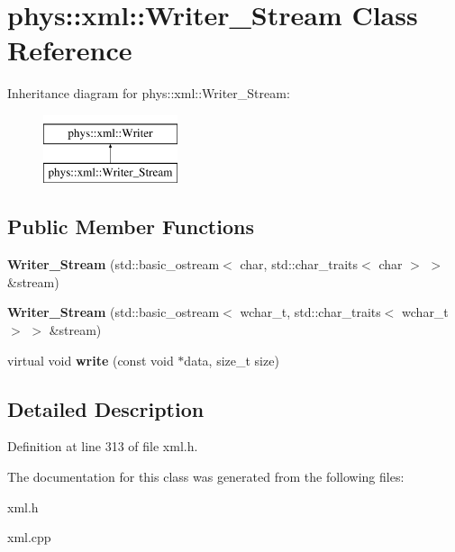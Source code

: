 \hypertarget{classphys_1_1xml_1_1Writer__Stream}{
\section{phys::xml::Writer\_\-Stream Class Reference}
\label{dc/d64/classphys_1_1xml_1_1Writer__Stream}
}
Inheritance diagram for phys::xml::Writer\_\-Stream:\begin{figure}[H]
\begin{center}
\leavevmode
\includegraphics[height=2.000000cm]{dc/d64/classphys_1_1xml_1_1Writer__Stream}
\end{center}
\end{figure}
\subsection*{Public Member Functions}
\begin{DoxyCompactItemize}
\item 
\hypertarget{classphys_1_1xml_1_1Writer__Stream_a4a770fabddf028fe207d50af81d6127d}{
{\bfseries Writer\_\-Stream} (std::basic\_\-ostream$<$ char, std::char\_\-traits$<$ char $>$ $>$ \&stream)}
\label{dc/d64/classphys_1_1xml_1_1Writer__Stream_a4a770fabddf028fe207d50af81d6127d}

\item 
\hypertarget{classphys_1_1xml_1_1Writer__Stream_adb18437fd8e3b203d3521120adb50d80}{
{\bfseries Writer\_\-Stream} (std::basic\_\-ostream$<$ wchar\_\-t, std::char\_\-traits$<$ wchar\_\-t $>$ $>$ \&stream)}
\label{dc/d64/classphys_1_1xml_1_1Writer__Stream_adb18437fd8e3b203d3521120adb50d80}

\item 
\hypertarget{classphys_1_1xml_1_1Writer__Stream_a96fed925ea63e09feee2e7f62f014538}{
virtual void {\bfseries write} (const void $\ast$data, size\_\-t size)}
\label{dc/d64/classphys_1_1xml_1_1Writer__Stream_a96fed925ea63e09feee2e7f62f014538}

\end{DoxyCompactItemize}


\subsection{Detailed Description}


Definition at line 313 of file xml.h.



The documentation for this class was generated from the following files:\begin{DoxyCompactItemize}
\item 
xml.h\item 
xml.cpp\end{DoxyCompactItemize}
